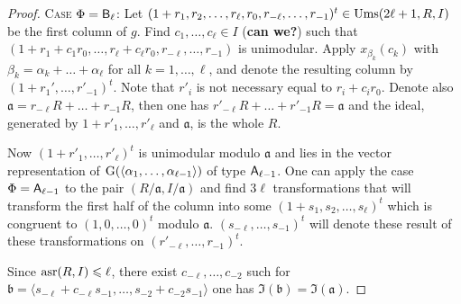 \begin{proof}
\textsc{Case $\Phi=\mathsf{B}_\ell$:}
Let $(1+r_1,r_2,\dots,r_\ell,r_0,r_{-\ell},\dots,r_{-1})^t\in\operatorname{Ums}(2\ell+1,R,I)$ be the first column of $g$. Find $c_1,\dots,c_\ell\in I$ (\textbf{can we?}) such that $(1+r_1+c_1r_0,\dots,r_\ell+c_\ell r_0,r_{-\ell},\dots,r_{-1})$ is unimodular. Apply $x_{\beta_k}(c_k)$ with $\beta_k=\alpha_k+\dots+\alpha_\ell$ for all $k=1,\dots,\ell$, and denote the resulting column by $(1+r_1',\dots,r'_{-1})^t$. Note that $r'_i$ is not necessary equal to $r_i+c_ir_0$. Denote also $\mathfrak{a}=r_{-\ell}R+\dots+r_{-1}R$, then one has $r'_{-\ell}R+\dots+r'_{-1}R=\mathfrak{a}$ and the ideal, generated by $1+r'_1,\dots,r'_\ell$ and $\mathfrak{a}$, is the whole $R$.

Now $(1+r'_1,\dots,r'_\ell)^t$ is unimodular modulo $\mathfrak{a}$ and lies in the vector representation of $\operatorname{G}(\langle\alpha_1,\dots,\alpha_{\ell-1}\rangle)$ of type $\mathsf{A}_{\ell-1}$. One can apply the case $\Phi=\mathsf{A}_{\ell-1}$ to the pair $(R/\mathfrak{a},I/\mathfrak{a})$ and find $3\ell$ transformations that will transform the first half of the column into some $(1+s_1,s_2,\dots,s_\ell)^t$ which is congruent to $(1,0,\dots,0)^t$ modulo $\mathfrak{a}$. $(s_{-\ell},\dots,s_{-1})^t$ will denote these result of these transformations on $(r'_{-\ell},\dots,r_{-1})^t$.

Since $\operatorname{asr}(R,I)\leqslant\ell$, there exist $c_{-\ell},\dots,c_{-2}$ such for $\mathfrak{b}=\langle s_{-\ell}+c_{-\ell}s_{-1},\dots,s_{-2}+c_{-2}s_{-1}\rangle$ one has $\mathfrak{I}(\mathfrak{b})=\mathfrak{I}(\mathfrak{a})$.
\end{proof}